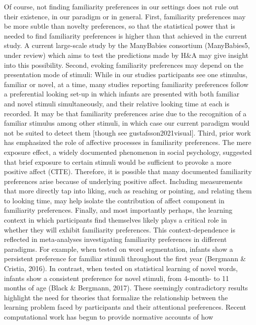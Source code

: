 \documentclass[10pt, letterpaper]{article}
\begin{document}
Of course, not finding familiarity preferences in our settings does not
rule out their existence, in our paradigm or in general. First,
familiarity preferences may be more subtle than novelty preferences, so
that the statistical power that is needed to find familiarity
preferences is higher than that achieved in the current study. A current
large-scale study by the ManyBabies consortium (ManyBabies5, under
review) which aims to test the predictions made by H\&A may give insight
into this possibility. Second, evoking familiarity preferences may
depend on the presentation mode of stimuli: While in our studies
participants see one stimulus, familiar or novel, at a time, many
studies reporting familiarity preferences follow a preferential looking
set-up in which infants are presented with both familiar and novel
stimuli simultaneously, and their relative looking time at each is
recorded. It may be that familiarity preferences arise due to the
recognition of a familiar stimulus among other stimuli, in which case
our current paradigm would not be suited to detect them {[}though see
gustafsson2021visual{]}. Third, prior work has emphasized the role of
affective processes in familiarity preferences. The mere exposure
effect, a widely documented phenomenon in social psychology, suggested
that brief exposure to certain stimuli would be sufficient to provoke a
more positive affect (CITE). Therefore, it is possible that many
documented familiarity preferences arise because of underlying positive
affect. Including measurements that more directly tap into liking, such
as reaching or pointing, and relating them to looking time, may help
isolate the contribution of affect component in familiarity preferences.
Finally, and most importantly perhaps, the learning context in which
participants find themselves likely plays a critical role in whether
they will exhibit familiarity preferences. This context-dependence is
reflected in meta-analyses investigating familiarity preferences in
different paradigms. For example, when tested on word segmentation,
infants show a persistent preference for familiar stimuli throughout the
first year (Bergmann \& Cristia, 2016). In contrast, when tested on
statistical learning of novel words, infants show a consistent
preference for novel stimuli, from 4-month- to 11 months of age (Black
\& Bergmann, 2017). These seemingly contradictory results highlight the
need for theories that formalize the relationship between the learning
problem faced by participants and their attentional preferences. Recent
computational work has begun to provide normative accounts of how
\end{document}
